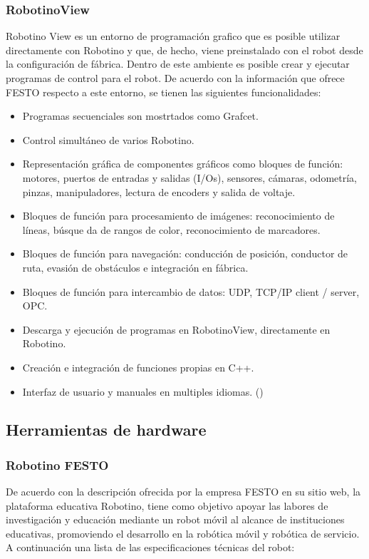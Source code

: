             \subsubsection{RobotinoView}
            Robotino View es un entorno de programación grafico que es posible utilizar directamente con Robotino y que, de hecho, viene preinstalado con el robot desde la configuración de fábrica. Dentro de este ambiente es posible crear y ejecutar programas de control para el robot.
            De acuerdo con la información que ofrece FESTO respecto a este entorno, se tienen las siguientes funcionalidades:
            \begin{itemize}
                \item Programas secuenciales son mostrtados como Grafcet.
                \item Control simultáneo de varios Robotino.
                \item Representación gráfica de componentes gráficos como bloques de función: motores, puertos de entradas y salidas (I/Os), sensores, cámaras, odometría, pinzas, manipuladores, lectura de encoders y salida de voltaje.
                \item Bloques de función para procesamiento de imágenes: reconocimiento de líneas, búsque da de rangos de color, reconocimiento de marcadores.
                \item Bloques de función para navegación: conducción de posición, conductor de ruta, evasión de obstáculos e integración en fábrica.
                \item Bloques de función para intercambio de datos: UDP, TCP/IP client / server, OPC.
                \item Descarga y ejecución de programas en RobotinoView, directamente en Robotino.
                \item Creación e integración de funciones propias en C++.
                \item Interfaz de usuario y manuales en multiples idiomas. (\cite*{FESTO-RobotinoView})
            \end{itemize}
            
        \subsection{Herramientas de hardware}
            \subsubsection{Robotino FESTO}
            De acuerdo con la descripción ofrecida por la empresa FESTO en su sitio web, la plataforma educativa Robotino, tiene como objetivo apoyar las labores de investigación y educación mediante un robot móvil al alcance de instituciones educativas, promoviendo el desarrollo en la robótica móvil y robótica de servicio. A continuación una lista de las especificaciones técnicas del robot:
            \phantom{saltodelineaforzado >:D\\}
            
